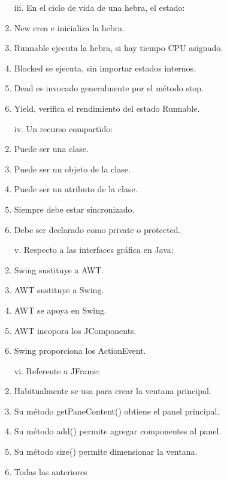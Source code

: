 \documentclass[10pt]{article}
\begin{document}
{\begin{enumerate}
\begin{multicols}{2}
    \begin{enumerate}[label=(\alph*)]
        \item[iii.] En el ciclo de vida de una hebra, el estado: 
        \item New crea e inicializa la hebra.
        \item Runnable ejecuta la hebra, si hay tiempo CPU asignado.
        \item Blocked se ejecuta, sin importar estados internos.
        \item Dead es invocado generalmente por el m\'etodo stop.
        \item Yield, verifica el rendimiento del estado Runnable.
    \end{enumerate}

    \begin{enumerate}[label=(\alph*)]
        \item[iv.] Un recurso compartido:
        \item Puede ser una clase.
        \item Puede ser un objeto de la clase.
        \item Puede ser un atributo de la clase.
        \item Siempre debe estar sincronizado.
        \item Debe ser declarado como private o protected.
    \end{enumerate}

    \begin{enumerate}[label=(\alph*)]
        \item[v.] Respecto a las interfaces gr\'afica en Java:
        \item Swing sustituye a AWT.
        \item AWT sustituye a Swing.
        \item AWT se apoya en Swing.
        \item AWT incopora los JComponents.
        \item Swing proporciona los ActionEvent.
    \end{enumerate}

    \begin{enumerate}[label=(\alph*)]
        \item[vi.] Referente a JFrame:
        \item Habitualmente se usa para crear la ventana principal.
        \item Su m\'etodo getPaneContent() obtiene el panel principal.
        \item Su m\'etodo add() permite agregar componentes al panel.
        \item Su m\'etodo size() permite dimensionar la ventana.
        \item Todas las anteriores
    \end{enumerate}


\end{multicols}
\end{enumerate}}
\end{document}
